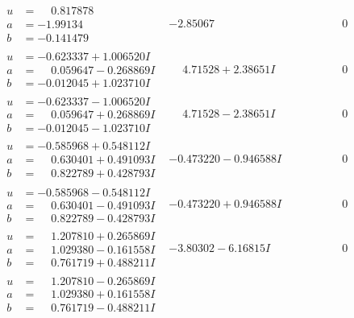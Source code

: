 \documentclass[1p]{elsarticle_modified}
\theoremstyle{definition}
\begin{document}
$$\begin{array}{c|c|c}
\begin{aligned}
u &= \phantom{-}0.817878\phantom{ +0.000000I} \\
a &= -1.99134\phantom{ +0.000000I} \\
b &= -0.141479\phantom{ +0.000000I}\end{aligned}
 & -2.85067\phantom{ +0.000000I} & \phantom{-0.000000 } 0 \\ \hline\begin{aligned}
u &= -0.623337 + 1.006520 I \\
a &= \phantom{-}0.059647 - 0.268869 I \\
b &= -0.012045 + 1.023710 I\end{aligned}
 & \phantom{-}4.71528 + 2.38651 I & \phantom{-0.000000 } 0 \\ \hline\begin{aligned}
u &= -0.623337 - 1.006520 I \\
a &= \phantom{-}0.059647 + 0.268869 I \\
b &= -0.012045 - 1.023710 I\end{aligned}
 & \phantom{-}4.71528 - 2.38651 I & \phantom{-0.000000 } 0 \\ \hline\begin{aligned}
u &= -0.585968 + 0.548112 I \\
a &= \phantom{-}0.630401 + 0.491093 I \\
b &= \phantom{-}0.822789 + 0.428793 I\end{aligned}
 & -0.473220 - 0.946588 I & \phantom{-0.000000 } 0 \\ \hline\begin{aligned}
u &= -0.585968 - 0.548112 I \\
a &= \phantom{-}0.630401 - 0.491093 I \\
b &= \phantom{-}0.822789 - 0.428793 I\end{aligned}
 & -0.473220 + 0.946588 I & \phantom{-0.000000 } 0 \\ \hline\begin{aligned}
u &= \phantom{-}1.207810 + 0.265869 I \\
a &= \phantom{-}1.029380 - 0.161558 I \\
b &= \phantom{-}0.761719 + 0.488211 I\end{aligned}
 & -3.80302 - 6.16815 I & \phantom{-0.000000 } 0 \\ \hline\begin{aligned}
u &= \phantom{-}1.207810 - 0.265869 I \\
a &= \phantom{-}1.029380 + 0.161558 I \\
b &= \phantom{-}0.761719 - 0.488211 I\end{aligned}

\end{array}$$
\end{document}
